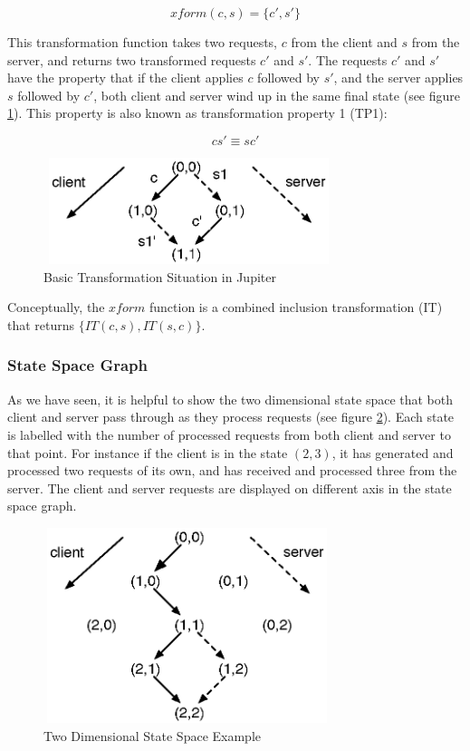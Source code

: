 $$ xform(c,s)=\{c',s'\} $$

This transformation function takes two requests, $c$ from the client and $s$ from the server, and returns two transformed requests $c'$ and $s'$. The requests $c'$ and $s'$ have the property that if the client applies $c$ followed by $s'$, and the server applies $s$ followed by $c'$, both client and server wind up in the same final state (see figure \ref{fig:concepts.basic}). This property is also known as transformation property 1 (TP1):

$$ c s' \equiv s c' $$

\begin{figure}[htb]
 \centering
 \includegraphics[width=8.5cm,height=3.1cm]{../../images/concepts_jupiter1.eps}
 \caption{Basic Transformation Situation in Jupiter}
 \label{fig:concepts.basic}
\end{figure}

Conceptually, the $xform$ function is a combined inclusion transformation (IT) that returns $\{IT(c,s),IT(s,c)\}$.

\subsubsection{State Space Graph}
As we have seen, it is helpful to show the two dimensional state space that both client and server pass through as they process requests (see figure \ref{fig:concepts.statespace}). Each state is labelled with the number of processed requests from both client and server to that point. For instance if the client is in the state $(2,3)$, it has generated and processed two requests of its own, and has received and processed three from the server. The client and server requests are displayed on different axis in the state space graph.

\begin{figure}[htb]
 \centering
 \includegraphics[width=8.4cm,height=5.7cm]{../../images/concepts_statespace.eps}
 \caption{Two Dimensional State Space Example}
 \label{fig:concepts.statespace}
\end{figure}

